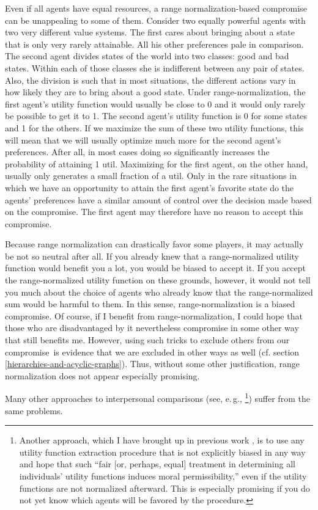 Even if all agents have equal resources, a range normalization-based
compromise can be unappealing to some of them. Consider two equally
powerful agents with two very different value systems. The first cares
about bringing about a state that is only very rarely attainable. All
his other preferences pale in comparison. The second agent divides
states of the world into two classes: good and bad states. Within each
of those classes she is indifferent between any pair of states. Also,
the division is such that in most situations, the different actions vary
in how likely they are to bring about a good state. Under
range-normalization, the first agent's utility function would usually be
close to 0 and it would only rarely be possible to get it to 1. The
second agent's utility function is 0 for some states and 1 for the
others. If we maximize the sum of these two utility functions, this will
mean that we will usually optimize much more for the second agent's
preferences. After all, in most cases doing so significantly increases
the probability of attaining 1 util. Maximizing for the first agent, on
the other hand, usually only generates a small fraction of a util. Only
in the rare situations in which we have an opportunity to attain the
first agent's favorite state do the agents' preferences have a similar
amount of control over the decision made based on the compromise. The
first agent may therefore have no reason to accept this compromise.

Because range normalization can drastically favor some players, it may
actually be not so neutral after all. If you already knew that a range-normalized utility function would benefit you a lot, you would be
biased to accept it. If you accept the range-normalized utility function
on these grounds, however, it would not tell you much about the choice
of agents who already know that the range-normalized sum would be
harmful to them. In this sense, range-normalization is a biased
compromise. Of course, if I benefit from range-normalization, I could
hope that those who are disadvantaged by it nevertheless compromise in
some other way that still benefits me. However, using such tricks to
exclude others from our compromise~is evidence that we are excluded in
other ways as well (cf. section
\ref{hierarchies-and-acyclic-graphs}). Thus, without some other justification, range
normalization does not appear especially promising.

Many other approaches to interpersonal comparisons (see, e.\,g.,
\cite{Sen2014-ns}\footnote{Another approach, which I
  have brought up in previous work
  \parencite[][section 3.2]{Oesterheld2016-pq}, is to use any utility
  function extraction procedure that is not explicitly biased in any way
  and hope that such ``fair {[}or, perhaps, equal{]} treatment in
  determining all individuals' utility functions induces moral
  permissibility,'' even if the utility functions are not normalized
  afterward. This is especially promising if you do not yet know which
  agents will be favored by the procedure.}) suffer from the same
problems.

